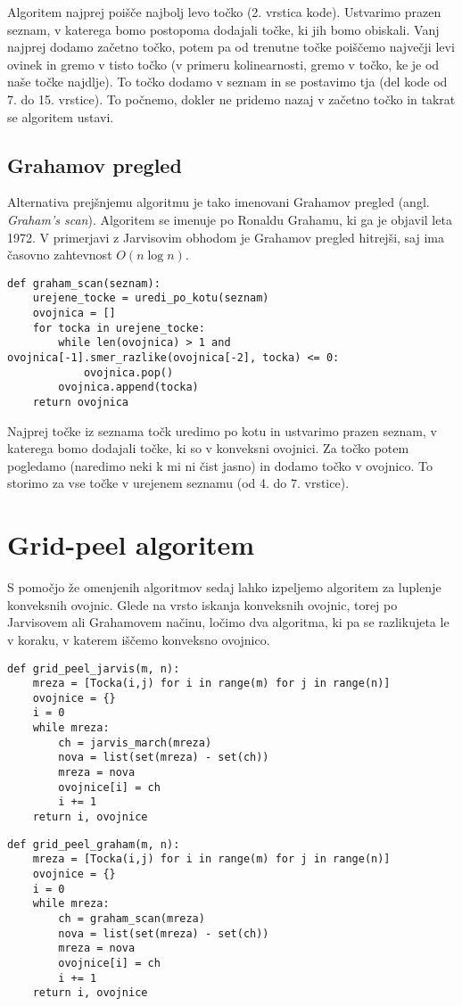 \documentclass[a4paper]{article}
\begin{document}
Algoritem najprej poišče najbolj levo točko (2. vrstica kode). Ustvarimo prazen seznam, v katerega bomo postopoma dodajali točke, ki jih bomo obiskali. Vanj najprej dodamo začetno točko,
potem pa od trenutne točke poiščemo največji levi ovinek in gremo v tisto točko (v primeru kolinearnosti, gremo v točko, ke je od naše točke najdlje). To točko dodamo v seznam in se postavimo
tja (del kode od 7. do 15. vrstice). To počnemo, dokler ne pridemo nazaj v začetno točko in takrat se algoritem ustavi.


\subsection{Grahamov pregled}
Alternativa prejšnjemu algoritmu je tako imenovani Grahamov pregled (angl. \textit{Graham's scan}). Algoritem se imenuje po Ronaldu Grahamu, ki ga je objavil leta 1972. 
V primerjavi z Jarvisovim obhodom je Grahamov pregled hitrejši, saj ima časovno zahtevnost $O(n \log n)$.

\begin{lstlisting}
def graham_scan(seznam):
    urejene_tocke = uredi_po_kotu(seznam)
    ovojnica = []
    for tocka in urejene_tocke:
        while len(ovojnica) > 1 and ovojnica[-1].smer_razlike(ovojnica[-2], tocka) <= 0:
            ovojnica.pop()
        ovojnica.append(tocka)
    return ovojnica
\end{lstlisting}

Najprej točke iz seznama točk uredimo po kotu in ustvarimo prazen seznam, v katerega bomo dodajali točke, ki so v konveksni ovojnici. Za točko potem pogledamo (naredimo neki k mi ni čist
jasno) in dodamo točko v ovojnico. To storimo za vse točke v urejenem seznamu (od 4. do 7. vrstice).

\section{Grid-peel algoritem}
S pomočjo že omenjenih algoritmov sedaj lahko izpeljemo algoritem za luplenje konveksnih ovojnic. Glede na vrsto iskanja konveksnih ovojnic, torej po Jarvisovem ali 
Grahamovem načinu, ločimo dva algoritma, ki pa se razlikujeta le v koraku, v katerem iščemo konveksno ovojnico.

\begin{lstlisting}
def grid_peel_jarvis(m, n):
    mreza = [Tocka(i,j) for i in range(m) for j in range(n)]
    ovojnice = {}
    i = 0
    while mreza:
        ch = jarvis_march(mreza)
        nova = list(set(mreza) - set(ch))
        mreza = nova
        ovojnice[i] = ch
        i += 1
    return i, ovojnice
\end{lstlisting}
\begin{lstlisting}
def grid_peel_graham(m, n):
    mreza = [Tocka(i,j) for i in range(m) for j in range(n)]
    ovojnice = {}
    i = 0
    while mreza:
        ch = graham_scan(mreza)
        nova = list(set(mreza) - set(ch))
        mreza = nova
        ovojnice[i] = ch
        i += 1
    return i, ovojnice
\end{lstlisting}
\end{document}
